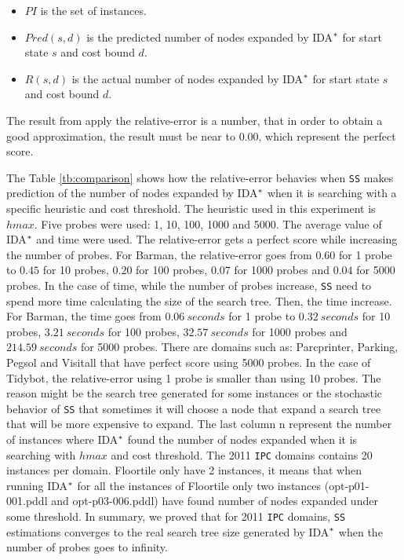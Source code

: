 \begin{itemize}
  \item $PI$ is the set of instances.
  \item $Pred(s,d)$ is the predicted number of nodes expanded by IDA$\sp{*}$ for start state $s$ and cost bound $d$.
  \item $R(s,d)$ is the actual number of nodes expanded by IDA$\sp{*}$ for start state $s$ and cost bound $d$.
\end{itemize}

The result from apply the relative-error is a number, that in order to obtain a good approximation, the result must be near to $0.00$, which represent the perfect score.

The Table \ref{tb:comparison} shows how the relative-error behavies when \texttt{SS} makes prediction of the number of nodes expanded by IDA$\sp{*}$ when it is searching with a specific heuristic and cost threshold. The heuristic used in this experiment is $hmax$. Five probes were used: 1, 10, 100, 1000 and 5000. The average value of IDA$\sp{*}$ and time were used. The relative-error gets a perfect score while increasing the number of probes. For Barman, the relative-error goes from $0.60$ for 1 probe to $0.45$ for 10 probes, $0.20$ for 100 probes, $0.07$ for 1000 probes and $0.04$ for 5000 probes. In the case of time, while the number of probes increase, \texttt{SS} need to spend more time calculating the size of the search tree. Then, the time increase. For Barman, the time goes from $0.06\ seconds$ for 1 probe to $0.32\ seconds$ for 10 probes, $3.21\ seconds$ for 100 probes, $32.57\ seconds$ for 1000 probes and $214.59\ seconds$ for 5000 probes. There are domains such as: Parcprinter, Parking, Pegsol and Visitall that have perfect score using 5000 probes. In the case of Tidybot, the relative-error using 1 probe is smaller than using 10 probes. The reason might be the search tree generated for some instances or the stochastic behavior of \texttt{SS} that sometimes it will choose a node that expand a search tree that will be more expensive to expand. The last column \textsf{n} represent the number of instances where IDA$\sp{*}$ found the number of nodes expanded when it is searching with $hmax$ and cost threshold. The 2011 \texttt{IPC} domains contains 20 instances per domain. Floortile only have 2 instances, it means that when running IDA$\sp{*}$ for all the instances of Floortile only two instances (opt-p01-001.pddl and opt-p03-006.pddl) have found number of nodes expanded under some threshold. In summary, we proved that for 2011 \texttt{IPC} domains, \texttt{SS} estimations converges to the real search tree size generated by IDA$\sp{*}$ when the number of probes goes to infinity.

